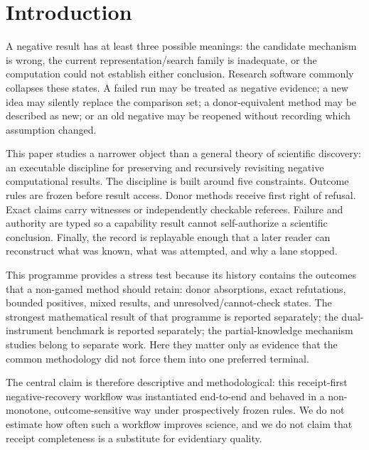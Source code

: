 \section{Introduction}

A negative result has at least three possible meanings: the candidate mechanism is wrong, the current representation/search family is inadequate, or the computation could not establish either conclusion. Research software commonly collapses these states. A failed run may be treated as negative evidence; a new idea may silently replace the comparison set; a donor-equivalent method may be described as new; or an old negative may be reopened without recording which assumption changed.

This paper studies a narrower object than a general theory of scientific discovery: an executable discipline for preserving and recursively revisiting negative computational results. The discipline is built around five constraints. Outcome rules are frozen before result access. Donor methods receive first right of refusal. Exact claims carry witnesses or independently checkable referees. Failure and authority are typed so a capability result cannot self-authorize a scientific conclusion. Finally, the record is replayable enough that a later reader can reconstruct what was known, what was attempted, and why a lane stopped.

This programme provides a stress test because its history contains the outcomes that a non-gamed method should retain: donor absorptions, exact refutations, bounded positives, mixed results, and unresolved/cannot-check states. The strongest mathematical result of that programme is reported separately; the dual-instrument benchmark is reported separately; the partial-knowledge mechanism studies belong to separate work. Here they matter only as evidence that the common methodology did not force them into one preferred terminal.

The central claim is therefore descriptive and methodological: this receipt-first negative-recovery workflow was instantiated end-to-end and behaved in a non-monotone, outcome-sensitive way under prospectively frozen rules. We do not estimate how often such a workflow improves science, and we do not claim that receipt completeness is a substitute for evidentiary quality.